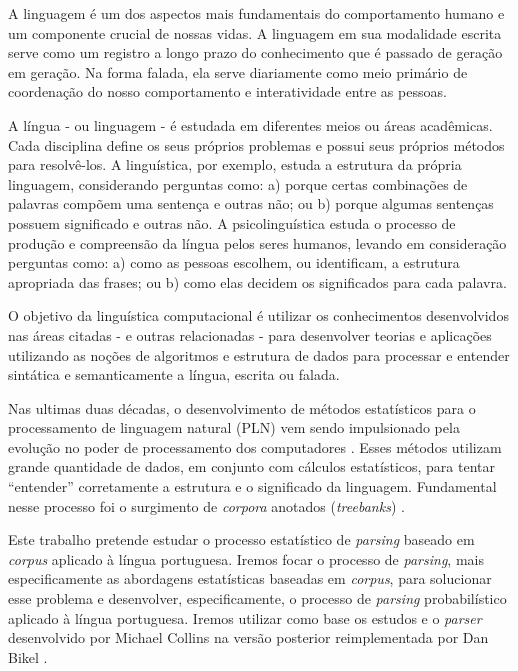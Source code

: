 A linguagem é um dos aspectos mais fundamentais do comportamento humano e um componente crucial de nossas vidas. A linguagem em sua modalidade escrita serve como um registro a longo prazo do conhecimento que é passado de geração em geração. Na forma falada, ela serve diariamente como meio primário de coordenação do nosso comportamento e interatividade entre as pessoas.

A língua - ou linguagem - é estudada em diferentes meios ou áreas acadêmicas. Cada disciplina define os seus próprios problemas e possui seus próprios métodos para resolvê-los. A linguística, por exemplo, estuda a estrutura da própria linguagem, considerando perguntas como: a) porque certas combinações de palavras compõem uma sentença e outras não; ou b) porque algumas sentenças possuem significado e outras não. A psicolinguística estuda o processo de produção e compreensão da língua pelos seres humanos, levando em consideração perguntas como: a) como as pessoas escolhem, ou identificam, a estrutura apropriada das frases; ou b) como elas decidem os significados para cada palavra.

O objetivo da linguística computacional é utilizar os conhecimentos desenvolvidos nas áreas citadas - e outras relacionadas - para desenvolver teorias e aplicações utilizando as noções de algoritmos e estrutura de dados para processar e entender sintática e semanticamente a língua, escrita ou falada.

Nas ultimas duas décadas, o desenvolvimento de métodos estatísticos para o processamento de linguagem natural (PLN) vem sendo impulsionado pela evolução no poder de processamento dos computadores \cite{manning99, jurafsky}. Esses métodos utilizam grande quantidade de dados, em conjunto com cálculos estatísticos, para tentar ``entender'' corretamente a estrutura e o significado da linguagem. Fundamental nesse processo foi o surgimento de \emph{corpora} anotados (\emph{treebanks}) \cite{marcus93,marcus94,abeille03,sardinha04}.

Este trabalho pretende estudar o processo estatístico de \emph{parsing} baseado em \emph{corpus} aplicado à língua portuguesa. Iremos focar o processo de \emph{parsing}, mais especificamente as abordagens estatísticas baseadas em \emph{corpus}, para solucionar esse problema e desenvolver, especificamente, o processo de \emph{parsing} probabilístico aplicado à língua portuguesa. Iremos utilizar como base os estudos e o \emph{parser} desenvolvido por Michael Collins \cite{collins99,collins97} na versão posterior reimplementada por Dan Bikel \cite{bikel04}.



